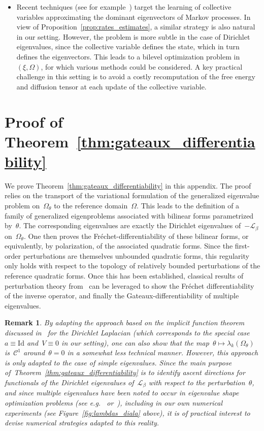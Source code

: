 \documentclass[a4]{article}
\newcommand{\cL}{\mathcal{L}}
\newcommand{\1}{\mathbbm 1}
\newcommand{\Id}{\mathrm{Id}}
\newtheorem{remark}{Remark}
\begin{document}
\begin{itemize}
    \item Recent techniques (see for example~\cite{MPWN18,WN20,ZS23,TLK25}) target the learning of collective variables approximating the dominant eigenvectors of Markov processes. In view of Proposition~\ref{prop:rates_estimates}, a similar strategy is also natural in our setting. However, the problem is more subtle in the case of Dirichlet eigenvalues, since the collective variable defines the state, which in turn defines the eigenvectors. This leads to a bilevel optimization problem in~$(\xi,\Omega)$, for which various methods could be considered. A key practical challenge in this setting is to avoid a costly recomputation of the free energy and diffusion tensor at each update of the collective variable.
\end{itemize}
\label{sec:ccl}

\appendix
\section{Proof of Theorem~\ref{thm:gateaux_differentiability}}
\label{sec:proof}
We prove Theorem~\ref{thm:gateaux_differentiability} in this appendix. The proof relies on the transport of the variational formulation of the generalized eigenvalue problem on~$\Omega_\theta$ to the reference domain~$\Omega$.
This leads to the definition of a family of generalized eigenproblems associated with bilinear forms parametrized by~$\theta$. The corresponding eigenvalues are exactly the Dirichlet eigenvalues of~$-\cL_\beta$ on~$\Omega_\theta$.
One then proves the Fréchet-differentiability of these bilinear forms, or equivalently, by polarization, of the associated quadratic forms. Since the first-order perturbations are themselves unbounded quadratic forms, this regularity only holds with respect to the topology of relatively bounded perturbations of the reference quadratic forms.
Once this has been established, classical results of perturbation theory from~\cite{K13} can be leveraged to show the Fréchet differentiability of the inverse operator, and finally the Gateaux-differentiability of multiple eigenvalues.
\begin{remark}
    By adapting the approach based on the implicit function theorem discussed in~\cite[Section 5.7]{HP05} for the Dirichlet Laplacian (which corresponds to the special case~$a\equiv\Id$ and~$V\equiv 0$ in our setting), one can also show that the map~$\theta\mapsto \lambda_k(\Omega_\theta)$ is~$\mathcal C^1$ around~$\theta=0$ in a somewhat less technical manner. 
    However, this approach is only adapted to the case of simple eigenvalues. Since the main purpose of~Theorem~\ref{thm:gateaux_differentiability} is to identify ascent directions for functionals of the Dirichlet eigenvalues of~$\cL_\beta$ with respect to the perturbation~$\theta$,
    and since multiple eigenvalues have been noted to occur in eigenvalue shape optimization problems (see e.g.~\cite[Theorem 2.5.10]{H06} or~\cite[Section 4.5]{O04}), including in our own numerical experiments (see Figure~\ref{fig:lambdas_diala} above), it is of practical interest to devise numerical strategies adapted to this reality.
\end{remark}
\end{document}
